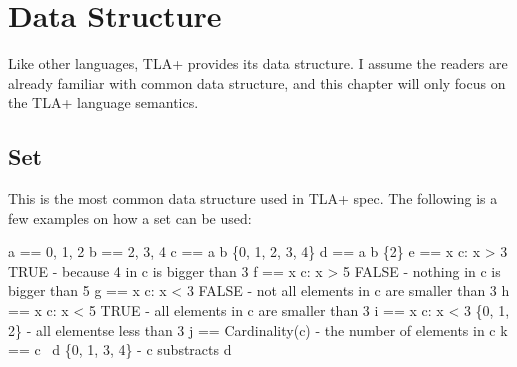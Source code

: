 \chapter{Data Structure}

Like other languages, TLA+ provides its data structure. I assume the readers are
already familiar with common data structure, and this chapter will only focus on
the TLA+ language semantics. 

\section{Set}

This is the most common data structure used in TLA+ spec. The following is a few examples on
how a set can be used:\newline
\begin{tla}
a == {0, 1, 2}
b == {2, 3, 4}
c == a \union b         \* \{0, 1, 2, 3, 4\}
d == a \intersect b     \* \{2\}
e == \E x \in c: x > 3  \* TRUE - because 4 in c is bigger than 3
f == \E x \in c: x > 5  \* FALSE - nothing in c is bigger than 5
g == \A x \in c: x < 3  \* FALSE - not all elements in c are smaller than 3
h == \A x \in c: x < 5  \* TRUE - all elements in c are smaller than 3
i == {x \in c: x < 3}   \* \{0, 1, 2\} - all elementse less than 3
j == Cardinality(c)      - the number of elements in c
k == c \ d              \* \{0, 1, 3, 4\} - c substracts d
\end{tla}
\begin{tlatex}
%
%
%
%
\@xx{}%
%
%
\@xx{}%
%
%
\@xx{}%
%
%
\@xx{}%
%
%
\@xx{}%
%
%
\@xx{}%
%
%
\@xx{}%
%
%
\@xx{}%
%
%
\@xx{}%
\end{tlatex}

